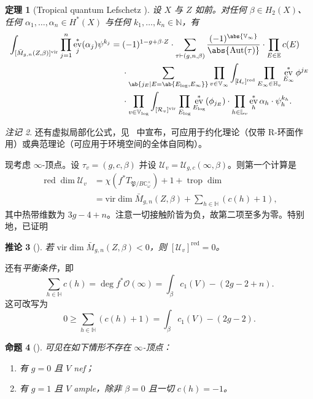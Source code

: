 \documentclass{amsart}
\newtheorem{thm}{定理}[section]
\newtheorem{cor}[thm]{推论}
\newtheorem{prop}[thm]{命题}
\theoremstyle{definition}
\theoremstyle{remark}
\newtheorem{rmk}[thm]{注记}
\theoremstyle{plain}
\theoremstyle{definition}
\theoremstyle{remark}
\newcommand{\N}{\mathbb{N}}
\newcommand{\C}{\mathbb{C}}
\newcommand{\E}{\mathbb{E}}
\newcommand{\V}{\mathbb{V}}
\renewcommand{\H}{\mathbb{H}}
\renewcommand{\L}{\mathbb{L}}
\newcommand{\mc}[1]{\mathcal{#1}}
\newcommand{\mf}[1]{\mathfrak{#1}}
\newcommand{\mr}[1]{\mathrm{#1}}
\newcommand{\on}[1]{\operatorname{#1}}
\newcommand{\1}{\mathbf{1}}
\newcommand{\2}{\mathbf{2}}
\newcommand{\3}{\mathbf{3}}
\newcommand{\vir}{\mr{vir}}
\DeclareMathOperator{\Aut}{Aut}
\DeclareMathOperator{\ev}{ev}
\begin{document}
\begin{thm}[Tropical quantum Lefschetz {\cite{CJRtropical2025}}]
    设 \(X\) 与 \(Z\) 如前。对任何 \(\beta \in H_2(X)\)、任何 \(\alpha_1, \ldots, \alpha_n \in H^*(X)\) 与任何 \(k_1, \ldots, k_n \in \N\)，有
    \begin{align*}
        \int_{[\bar{M}_{g,n}(Z,\beta)]^{\vir}} \prod_{j=1}^n \ev_j^* (\alpha_j) \psi^{k_j}={}& (-1)^{1-g+\beta \cdot Z} \cdot \sum_{\tau \vdash (g,n,\beta)} \frac{(-1)^{\abs{\V_{\infty}}}}{\abs{\Aut(\tau)}} \cdot \prod_{E \in \E} c(E) \\
        & \cdot \sum_{\ab\{j_E \mid E = \ab\{E_{\log}, E_{\infty}\}\}}  \prod_{v \in \V_{\infty}} \int_{[\mc{U}_v]^{\on{red}}} \prod_{E_{\infty} \in \H_v} \ev_{E_{\infty}}^* \phi^{j_E}  \\
        &  \cdot \prod_{v \in \V_{\log}} \int_{[\mc{R}_v]^{\vir}} \prod_{E_{\log}} \ev_{E_{\log}}^* (\phi_{j_E}) \cdot \prod_{h \in \L_v} \ev_h^* \alpha_h \cdot \psi_h^{k_h} .
    \end{align*}
\end{thm}

\begin{rmk}
    还有虚拟局部化公式，见~\cite{CJRlocalization} 中宣布，可应用于约化理论（仅带 R-环面作用）或典范理论（可应用于环境空间的全体自同构）。
\end{rmk}

现考虑 \(\infty\)-顶点。设 \(\tau_v = (g, c, \beta)\) 并设 \(\mc{U}_v = \mc{U}_{g,c}(\infty, \beta)\)。则第一个计算是
\begin{align*}
    \on{red}\dim \mc{U}_v &= \chi(f^* T_{\mf{P}/B \C^{\times}_{\omega}}) + 1 + \on{trop}\dim  \\
    &= \vir\dim \bar{M}_{g,n}(Z, \beta) + \sum_{h \in \H } (c(h) + 1),
\end{align*}
其中热带维数为 \(3g-4+n\)。注意一切接触阶皆为负，故第二项至多为零。特别地，已证明
\begin{cor}[{\cite{CJRpunctured}}]
    若 \(\vir\dim \bar{M}_{g,n}(Z,\beta) < 0\)，则 \([\mc{U}_v]^{\on{red}} = 0\)。
\end{cor}
还有\textit{平衡条件}，即
\begin{equation}\label{eqn:balancing condition}
    \sum_{h \in \H} c(h) = \deg f^* \mc{O}(\infty) = \int_{\beta} c_1(V) - (2g-2+n).
\end{equation}
这可改写为
\[ 0 \geq \sum_{h \in \H} (c(h)+1) = \int_{\beta} c_1(V) - (2g-2). \]
\begin{prop}[{\cite{CJRpunctured}}]
    可见在如下情形不存在 \(\infty\)-顶点：
    \begin{enumerate}
        \item 有 \(g = 0\) 且 \(V\) nef；
        \item 有 \(g=1\) 且 \(V\) ample，除非 \(\beta = 0\) 且一切 \(c(h) = -1\)。
    \end{enumerate}
\end{prop}
\end{document}

